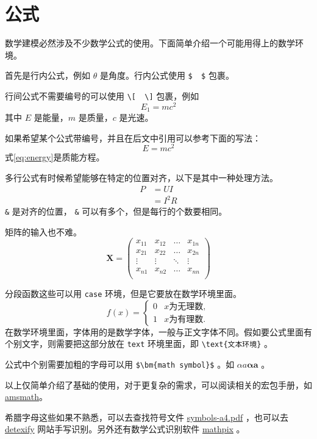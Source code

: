 \section{公式}

数学建模必然涉及不少数学公式的使用。下面简单介绍一个可能用得上的数学环境。

首先是行内公式，例如 $ \theta $ 是角度。行内公式使用 \verb|$  $| 包裹。

行间公式不需要编号的可以使用 \verb|\[  \]| 包裹，例如
\[
E_1=mc^2
\]
其中 $ E $ 是能量，$ m $ 是质量，$ c $ 是光速。

如果希望某个公式带编号，并且在后文中引用可以参考下面的写法：
\begin{equation}
E=mc^2
\label{eq:energy}
\end{equation}
式\cref{eq:energy}是质能方程。

多行公式有时候希望能够在特定的位置对齐，以下是其中一种处理方法。
\begin{align}
P & = UI \\
& = I^2R
\end{align}
\verb|&| 是对齐的位置， \verb|&| 可以有多个，但是每行的个数要相同。

矩阵的输入也不难。
\[
\mathbf{X} = \left(
    \begin{array}{cccc}
    x_{11} & x_{12} & \ldots & x_{1n}\\
    x_{21} & x_{22} & \ldots & x_{2n}\\
    \vdots & \vdots & \ddots & \vdots\\
    x_{n1} & x_{n2} & \ldots & x_{nn}\\
    \end{array} \right)
\]

分段函数这些可以用 \verb|case| 环境，但是它要放在数学环境里面。
\[
f(x) =
    \begin{cases}
        0 &  x \text{为无理数} ,\\
        1 &  x \text{为有理数} .
    \end{cases}
\]
在数学环境里面，字体用的是数学字体，一般与正文字体不同。假如要公式里面有个别文字，则需要把这部分放在 \verb|text| 环境里面，即 \verb|\text{文本环境}| 。

公式中个别需要加粗的字母可以用 \verb|$\bm{math symbol}$| 。如 $ \alpha a\bm{\alpha a} $ 。

以上仅简单介绍了基础的使用，对于更复杂的需求，可以阅读相关的宏包手册，如 \href{http://texdoc.net/texmf-dist/doc/latex/amsmath/amsldoc.pdf}{amsmath}。

希腊字母这些如果不熟悉，可以去查找符号文件 \href{http://mirrors.ctan.org/info/symbols/comprehensive/symbols-a4.pdf}{symbols-a4.pdf} ，也可以去 \href{http://detexify.kirelabs.org/classify.html}{detexify} 网站手写识别。另外还有数学公式识别软件 \href{https://mathpix.com/}{mathpix} 。
